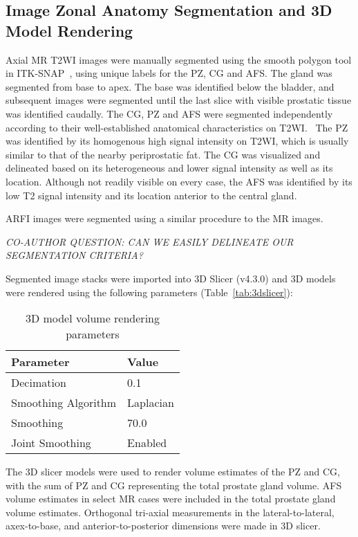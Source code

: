 \subsection{Image Zonal Anatomy Segmentation and 3D Model Rendering}
Axial MR T2WI images were manually segmented using the smooth polygon tool in
ITK-SNAP~\cite{Yushkevich2006}, using unique labels for the PZ, CG and AFS. The
gland was segmented from base to apex.  The base was identified below the
bladder, and subsequent images were segmented until the last slice with visible
prostatic tissue was identified caudally. The CG, PZ and AFS were segmented
independently according to their well-established anatomical characteristics on
T2WI.~\cite{Verma2011,Jung2012,Poon1985,Hricak2007,Bonekamp2011} The PZ was
identified by its homogenous high signal intensity on T2WI, which is usually
similar to that of the nearby periprostatic fat. The CG was visualized and
delineated based on its heterogeneous and lower signal intensity as well as its
location. Although not readily visible on every case, the AFS was identified by
its low T2 signal intensity and its location anterior to the central gland. 

ARFI images were segmented using a similar procedure to the MR images.

\emph{CO-AUTHOR QUESTION: CAN WE EASILY DELINEATE OUR SEGMENTATION CRITERIA?}

Segmented image stacks were imported into 3D Slicer (v4.3.0) and 3D
models were rendered using the following parameters (Table~\ref{tab:3dslicer}):

\begin{table}[h!]
\centering
\caption{3D model volume rendering parameters}
\begin{tabular}{ll}
{\bf Parameter} & {\bf Value} \\ \hline
Decimation & 0.1 \\
Smoothing Algorithm & Laplacian \\
Smoothing  & 70.0 \\
Joint Smoothing & Enabled \\
\end{tabular}
\end{table}

The 3D slicer models were used to render volume estimates of the PZ and CG,
with the sum of PZ and CG representing the total prostate gland volume.  AFS
volume estimates in select MR cases were included in the total prostate gland
volume estimates.  Orthogonal tri-axial measurements in the lateral-to-lateral,
axex-to-base, and anterior-to-posterior dimensions were made in 3D slicer.
